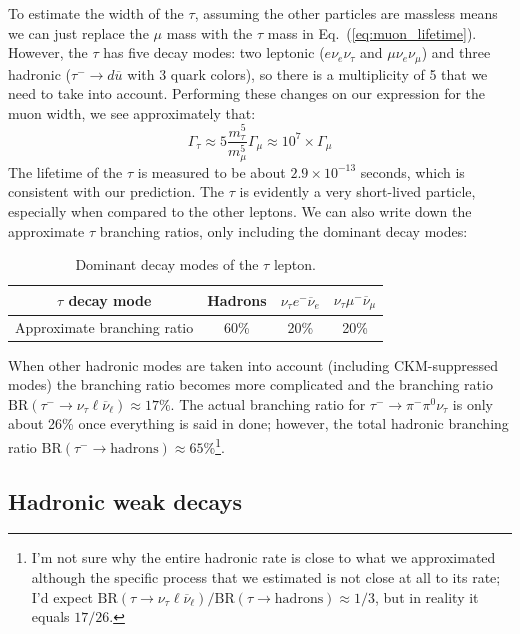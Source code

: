 \documentclass[11pt, oneside]{article}   	%
\theoremstyle{definition}
\numberwithin{equation}{subsection}		%
\begin{document}
To estimate the width of the $\tau$, assuming the other particles are massless means we can just replace the $\mu$ mass with the $\tau$ mass in Eq.~(\ref{eq:muon_lifetime}). 
However, the $\tau$ has five decay modes: two leptonic ($e\nu_e\nu_\tau$ and $\mu\nu_e\nu_\mu$) and three hadronic ($\tau^-\rightarrow d\overline u$ with 3 quark colors), 
so there is a multiplicity of 5 that we need to take into account. Performing these changes on our expression for the muon width, we see approximately that:
\begin{equation}
	\Gamma_\tau\approx 5\frac{m_\tau^5}{m_\mu^5}\Gamma_\mu \approx 10^{7}\times \Gamma_\mu
\end{equation}
The lifetime of the $\tau$ is measured to be about $2.9\times 10^{-13}$ seconds, which is consistent with our prediction. The $\tau$ is evidently a very short-lived particle, 
especially when compared to the other leptons. We can also write down the approximate $\tau$ branching ratios, only including the dominant decay modes:
\begin{table}[H]
	\centering
	\begin{tabular}{ | c | c | c | c |}
		\hline
		$\tau$ decay mode & Hadrons & $\nu_\tau e^-\overline\nu_e$ & $\nu_\tau\mu^-\overline\nu_\mu$ \\
		\hline
		Approximate branching ratio & 60\% & 20\% & 20\% \\
		\hline
	\end{tabular}
	\caption{Dominant decay modes of the $\tau$ lepton.}
	\label{table:tau_decay}
\end{table}
When other hadronic modes are taken into account (including CKM-suppressed modes) the branching ratio becomes more complicated and the branching ratio $\mathrm{BR}(\tau^-
\rightarrow\nu_\tau\ell\overline\nu_\ell)\approx 17\%$. The actual branching ratio for $\tau^-\rightarrow\pi^-\pi^0\nu_\tau$ is only about 26\% once everything is said in done; however, 
the total hadronic branching ratio $\mathrm{BR}(\tau^-\rightarrow\mathrm{hadrons})\approx 65\%$\footnote{I'm not sure why the entire 
hadronic rate is close to what we approximated although the specific process that we estimated is not close at all to its rate; I'd expect 
$\mathrm{BR}(\tau\rightarrow\nu_\tau\ell\overline\nu_\ell) / \mathrm{BR}(\tau\rightarrow\mathrm{hadrons})\approx 1 / 3$, but in reality it 
equals $17 / 26$.}.

\subsection{Hadronic weak decays}
\end{document}
